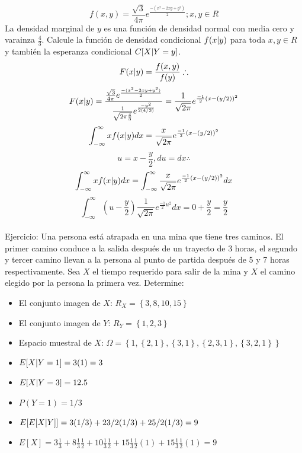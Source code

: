 \documentclass[11pt,fleqn]{book} %
\numberwithin{equation}{section} %
\numberwithin{figure}{section} %
\numberwithin{table}{section} %
\begin{document}
$$ f(x,y) = \frac{\sqrt{3}}{4 \pi} e^{\frac{-(x^{2}-2xy +y^{2})}{2}}; x,y \in R     $$
La densidad marginal de $y$ es una función de densidad normal con media cero y varainza $\frac{4}{3}$. Calcule la función de densidad condicional $f(x \arrowvert y)$  para toda $x,y \in R$ y también la esperanza condicional $C[X \arrowvert Y = y]$.
$$ F(x \arrowvert y) = \frac{f(x,y)}{f(y)} \therefore$$
$$ F(x \arrowvert y) = \frac{\frac{\sqrt{3}}{4 \pi} e^{\frac{-(x^{2}-2xy +y^{2})}{2}}}{\frac{1}{\sqrt{2 \pi \frac{4}{3}}} e^{\frac{-y^{2}}{2(4/3)}}} = \frac{1}{\sqrt{2 \pi}} e^{{\frac{-1}{2}} (x - (y/2))^{2}} $$
$$ \int_{-\infty}^{\infty} x f(x \arrowvert y) dx = \frac{x}{\sqrt{2 \pi}} e^{{\frac{-1}{2}} (x - (y/2))^{2}} $$
$$ u = x- \frac{y}{2}, du = dx \therefore   $$
$$ \int_{-\infty}^{\infty} x f(x \arrowvert y) dx = \int_{-\infty}^{\infty} \frac{x}{\sqrt{2 \pi}} e^{{\frac{-1}{2}} (x - (y/2))^{2}}  dx $$
$$ \int_{-\infty}^{\infty} (u - \frac{y}{2}) \frac{1}{\sqrt{2 \pi}} e^{{\frac{-1}{2}} u^{2}}  dx  = 0 + \frac{y}{2} = \frac{y}{2} $$
\ \\%
Ejercicio: Una persona está atrapada en una mina que tiene tres caminos. El primer camino conduce a la salida después de un trayecto de 3 horas, el segundo y tercer camino llevan a la persona al punto de partida después de 5 y 7 horas respectivamente. Sea $X$ el tiempo requerido para salir de la mina y $X$ el camino elegido por la persona la primera vez. Determine:
\begin{itemize}
    \item El conjunto imagen de $X$: $ R_{X} = \left\{ 3,8,10,15 \right\}  $
    \item El conjunto imagen de $Y$: $ R_{Y} = \left\{ 1,2,3 \right\} $
    \item Espacio muestral de $X$: $ \Omega = \left\{ 1, \left\{ 2,1 \right\}, \left\{ 3,1 \right\}, \left\{ 2,3,1 \right\}, \left\{ 3,2,1 \right\} \right\} $
    \item $E[X \arrowvert Y=1 ] = 3(1) = 3 $
    \item $E[X \arrowvert Y=3 ] = 12.5      $
    \item $P(Y=1) = 1/3 $
    \item $E[E[X \arrowvert Y]] = 3(1/3) + 23/2 (1/3) + 25/2 (1/3) = 9$
    \item $E[X] = 3\frac{1}{3} + 8\frac{1}{3}\frac{1}{2} + 10\frac{1}{3}\frac{1}{2}  + 15\frac{1}{3}\frac{1}{2}(1) + 15\frac{1}{3}\frac{1}{2}(1) = 9 $
\end{itemize}
\newpage
\end{document}
